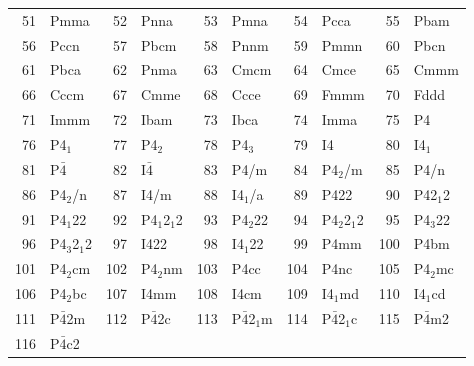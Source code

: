 \documentclass[final,12pt]{article}
\begin{document}
{{{{{{\begin{table}[h!]
\begin{center}
\begin{tabular}{||r|l||r|l||r|l||r|l||r|l||}
51     & Pmma               & 
52     & Pnna               & 
53     & Pmna               & 
54     & Pcca               & 
55     & Pbam               \\
56     & Pccn               & 
57     & Pbcm               & 
58     & Pnnm               & 
59     & Pmmn               & 
60     & Pbcn               \\
61     & Pbca               & 
62     & Pnma               & 
63     & Cmcm               & 
64     & Cmce               & 
65     & Cmmm               \\
66     & Cccm               & 
67     & Cmme               & 
68     & Ccce               & 
69     & Fmmm               & 
70     & Fddd               \\
71     & Immm               & 
72     & Ibam               & 
73     & Ibca               & 
74     & Imma               & 
75     & P4                 \\
76     & P4$_1$             & 
77     & P4$_2$             & 
78     & P4$_3$             & 
79     & I4                 & 
80     & I4$_1$             \\
81     & P$\bar{4}$                & 
82     & I$\bar{4}$                & 
83     & P4/m               & 
84     & P4$_2$/m           & 
85     & P4/n               \\
86     & P4$_2$/n           & 
87     & I4/m               & 
88     & I4$_1$/a           & 
89     & P422               & 
90     & P42$_1$2           \\
91     & P4$_1$22           & 
92     & P4$_1$2$_1$2       & 
93     & P4$_2$22           & 
94     & P4$_2$2$_1$2       & 
95     & P4$_3$22           \\
96     & P4$_3$2$_1$2       & 
97     & I422               & 
98     & I4$_1$22           & 
99     & P4mm               & 
100    & P4bm               \\
101    & P4$_2$cm           & 
102    & P4$_2$nm           & 
103    & P4cc               & 
104    & P4nc               & 
105    & P4$_2$mc           \\
106    & P4$_2$bc           & 
107    & I4mm               & 
108    & I4cm               & 
109    & I4$_1$md           & 
110    & I4$_1$cd           \\
111    & P$\bar{4}$2m              & 
112    & P$\bar{4}$2c              & 
113    & P$\bar{4}$2$_1$m          & 
114    & P$\bar{4}$2$_1$c          & 
115    & P$\bar{4}$m2              \\
116    & P$\bar{4}$c2              & 

\end{tabular}
\end{center}
\end{table}}}}}}}
\end{document}
